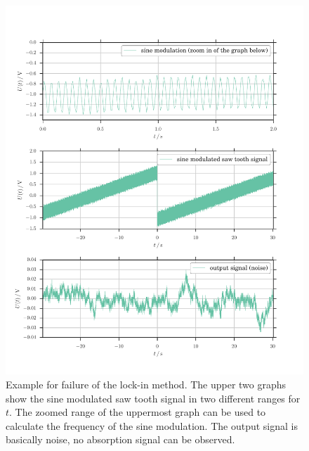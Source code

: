\begin{figure}
	\includegraphics[width=\textwidth]{figures/example.pdf}
	\caption{
		Example for failure of the lock-in method.
		The upper two graphs show the sine modulated saw tooth signal
		in two different ranges for $t$. The zoomed range of the uppermost 
		graph can be used to calculate the frequency of the sine modulation.
		The output signal is basically noise, no absorption signal can be observed.
		}
	\label{fig:lock_in_example}
\end{figure}

